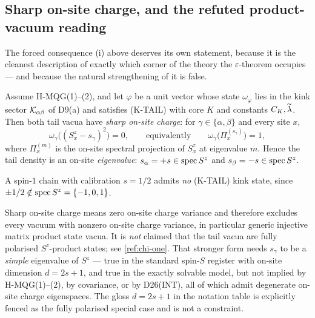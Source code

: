 \subsection{Sharp on-site charge, and the refuted product-vacuum reading}
\label{subsec:sharp-charge}

The forced consequence (i) above deserves its own statement, because it is the
cleanest description of exactly which corner of the theory the
$\varepsilon$-theorem occupies --- and because the natural strengthening of it
is false.

\begin{theorem}
\label{thm:sharp-charge}
\statusProved\;
Assume H-MQG(1)--(2), and let $\varphi$ be a unit vector whose state
$\omega_\varphi$ lies in the kink sector $\mathcal{K}_{\alpha\beta}$ of D9(a) and
satisfies (K-TAIL) with core $K$ and constants $C_K,\widetilde{\lambda}$. Then both tail
vacua have \emph{sharp on-site charge}: for $\gamma\in\{\alpha,\beta\}$ and
every site $x$,
\begin{equation}
  \omega_\gamma\bigl((S^z_x-s_\gamma)^2\bigr)=0,
  \qquad\text{equivalently}\qquad
  \omega_\gamma\bigl(\Pi_x^{(s_\gamma)}\bigr)=1,
  \label{eq:sharp-charge}
\end{equation}
where $\Pi_x^{(m)}$ is the on-site spectral projection of $S^z_x$ at
eigenvalue $m$. Hence the tail density is an on-site \emph{eigenvalue}:
$s_\alpha=+s\in\operatorname{spec} S^z$ and $s_\beta=-s\in\operatorname{spec} S^z$.
\end{theorem}

\begin{corollary}
\label{cor:spin-one-exclusion}
\statusProved\;
A spin-$1$ chain with calibration $s=1/2$ admits \emph{no} (K-TAIL) kink
state, since $\pm1/2\notin\operatorname{spec} S^z=\{-1,0,1\}$.
\end{corollary}

\begin{scope}
\label{scope:sharp-charge}
Sharp on-site charge means zero on-site charge variance and therefore excludes
every vacuum with nonzero on-site charge variance, in particular generic
injective matrix product state vacua. It is \emph{not} claimed that the tail
vacua are fully polarised $S^z$-product states; see \cref{ref:chi-one}. That
stronger form needs $s_\gamma$ to be a \emph{simple} eigenvalue of $S^z$ ---
true in the standard spin-$S$ register with on-site dimension $d=2s+1$, and
true in the exactly solvable model, but not implied by H-MQG(1)--(2), by
covariance, or by D26(INT), all of which admit degenerate on-site charge
eigenspaces. The gloss $d=2s+1$ in the notation table is explicitly fenced as
the fully polarised special case and is not a constraint.
\end{scope}

